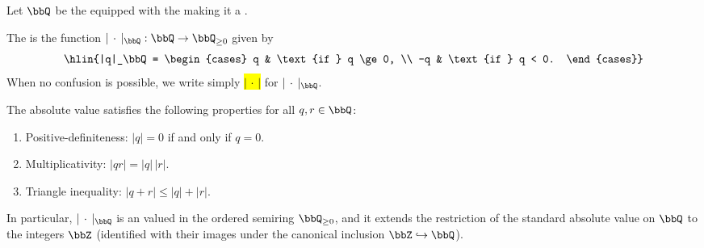 \begin{definition} \label{definition:absolute_value_on_rational_numbers}
    Let $\bbQ$ be the  equipped with the  making it a .

    The  is the function $|\,\cdot\,|_\bbQ : \bbQ \to \bbQ_{\ge 0}$ given by
    $$\hlin{|q|_\bbQ = \begin{cases} q & \text{if } q \ge 0, \\ -q & \text{if } q < 0. \end{cases}}$$
    When no confusion is possible, we write simply \hl{$|\,\cdot\,|$} for $|\,\cdot\,|_\bbQ$.

    The absolute value satisfies the following properties for all $q, r \in \bbQ$:
    \begin{enumerate}
        \item Positive-definiteness: $|q| = 0$ if and only if $q = 0$.
        \item Multiplicativity: $|q r| = |q|\,|r|$.
        \item Triangle inequality: $|q + r| \le |q| + |r|$.
    \end{enumerate}
    In particular, $|\,\cdot\,|_\bbQ$ is an  valued in the ordered semiring $\bbQ_{\geq 0}$, and it extends the restriction of the standard absolute value on $\bbQ$ to the integers $\bbZ$ (identified with their images under the canonical inclusion $\bbZ \hookrightarrow \bbQ$).
\end{definition}